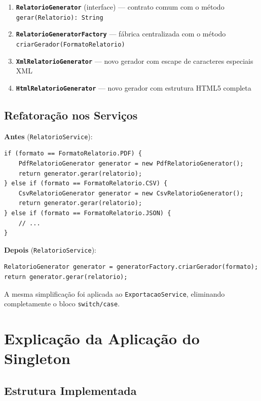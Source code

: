 \documentclass[12pt, a4paper]{article}
\begin{document}
\begin{enumerate}
    \item \textbf{\texttt{RelatorioGenerator}} (interface) --- contrato comum com o método \texttt{gerar(Relatorio): String}
    \item \textbf{\texttt{RelatorioGeneratorFactory}} --- fábrica centralizada com o método \texttt{criarGerador(FormatoRelatorio)}
    \item \textbf{\texttt{XmlRelatorioGenerator}} --- novo gerador com escape de caracteres especiais XML
    \item \textbf{\texttt{HtmlRelatorioGenerator}} --- novo gerador com estrutura HTML5 completa
\end{enumerate}

\subsection{Refatoração nos Serviços}

\textbf{Antes} (\texttt{RelatorioService}):

\begin{lstlisting}
if (formato == FormatoRelatorio.PDF) {
    PdfRelatorioGenerator generator = new PdfRelatorioGenerator();
    return generator.gerar(relatorio);
} else if (formato == FormatoRelatorio.CSV) {
    CsvRelatorioGenerator generator = new CsvRelatorioGenerator();
    return generator.gerar(relatorio);
} else if (formato == FormatoRelatorio.JSON) {
    // ...
}
\end{lstlisting}

\textbf{Depois} (\texttt{RelatorioService}):

\begin{lstlisting}
RelatorioGenerator generator = generatorFactory.criarGerador(formato);
return generator.gerar(relatorio);
\end{lstlisting}

A mesma simplificação foi aplicada ao \texttt{ExportacaoService}, eliminando completamente o bloco \texttt{switch/case}.

\section{Explicação da Aplicação do Singleton}

\subsection{Estrutura Implementada}
\end{document}
